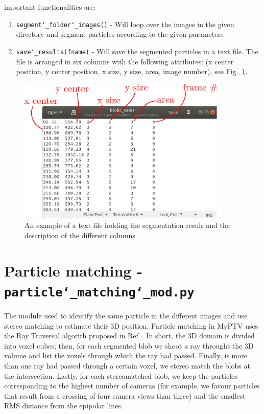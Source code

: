 \documentclass[10pt,a4paper]{article}
\begin{document}
important functionalities are:
%
\begin{enumerate}
	\item \texttt{segment\char`_folder\char`_images()} - Will loop over the images in the given directory and segment particles according to the given parameters
	\item \texttt{save\char`_results(fname)} - Will save the segmented particles in a text file. The file is arranged in six columns with the following attributes: (x center position, y center position, x size, y size, area, image number), see Fig.~\ref{fig:blobfile}.
\end{enumerate}

\begin{figure}[h!]
	\centering
	\includegraphics[width=10cm]{blob_file.pdf}
	\caption{An example of a text file holding the segmentation resuls and the description of the different columns. \label{fig:blobfile}} 
\end{figure}








\section{Particle matching - \texttt{particle\char`_matching\char`_mod.py}}

The module used to identify the same particle in the different images and use stereo matching to estimate their 3D position. Particle matching in MyPTV uses the Ray Traversal algorith proposed in Ref~\cite{Bourgoin2020}. In short, the 3D domain is divided into voxel cubes; then, for each segmented blob we shoot a ray throught the 3D volume and list the voxels through which the ray had passed. Finally, is more than one ray had passed through a certain voxel, we stereo match the blobs at the intersection. Lastly, for each stereomatched blob, we keep the particles corresponding to the highest number of cameras (for example, we favour particles that result from a crossing of four camera views than three) and the smallest RMS distance from the epipolar lines.  
\end{document}
